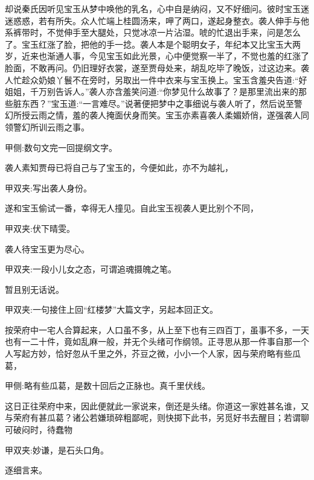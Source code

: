 \begin{parag}
    却说秦氏因听见宝玉从梦中唤他的乳名，心中自是纳闷，又不好细问。彼时宝玉迷迷惑惑，若有所失。众人忙端上桂圆汤来，呷了两口，遂起身整衣。袭人伸手与他系裤带时，不觉伸手至大腿处，只觉冰凉一片沾湿。唬的忙退出手来，问是怎么了。宝玉红涨了脸，把他的手一捻。袭人本是个聪明女子，年纪本又比宝玉大两岁，近来也渐通人事，今见宝玉如此光景，心中便觉察一半了，不觉也羞的红涨了脸面，不敢再问。仍旧理好衣裳，遂至贾母处来，胡乱吃毕了晚饭，过这边来。袭人忙趁众奶娘丫鬟不在旁时，另取出一件中衣来与宝玉换上。宝玉含羞央告道:“好姐姐，千万别告诉人。”袭人亦含羞笑问道:“你梦见什么故事了？是那里流出来的那些脏东西？”宝玉道:“一言难尽。”说著便把梦中之事细说与袭人听了，然后说至警幻所授云雨之情，羞的袭人掩面伏身而笑。宝玉亦素喜袭人柔媚娇俏，遂强袭人同领警幻所训云雨之事。\begin{note}甲侧:数句文完一回提纲文字。\end{note}袭人素知贾母已将自己与了宝玉的，今便如此，亦不为越礼，\begin{note}甲双夹:写出袭人身份。\end{note}遂和宝玉偷试一番，幸得无人撞见。自此宝玉视袭人更比别个不同，\begin{note}甲双夹:伏下晴雯。\end{note}袭人待宝玉更为尽心。\begin{note}甲双夹:一段小儿女之态，可谓追魂摄魄之笔。\end{note}暂且别无话说。\begin{note}甲双夹:一句接住上回“红楼梦”大篇文字，另起本回正文。\end{note}
\end{parag}


\begin{parag}
    按荣府中一宅人合算起来，人口虽不多，从上至下也有三四百丁，虽事不多，一天也有一二十件，竟如乱麻一般，并无个头绪可作纲领。正寻思从那一件事自那一个人写起方妙，恰好忽从千里之外，芥豆之微，小小一个人家，因与荣府略有些瓜葛，\begin{note}甲侧:略有些瓜葛，是数十回后之正脉也。真千里伏线。 \end{note}这日正往荣府中来，因此便就此一家说来，倒还是头绪。你道这一家姓甚名谁，又与荣府有甚瓜葛？诸公若嫌琐碎粗鄙呢，则快掷下此书，另觅好书去醒目；若谓聊可破闷时，待蠢物\begin{note}甲双夹:妙谦，是石头口角。\end{note}逐细言来。
\end{parag}


